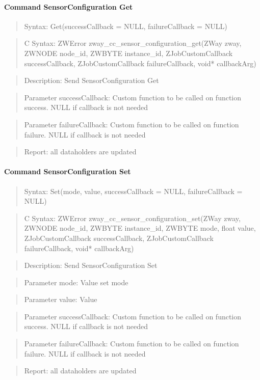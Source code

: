 \paragraph{Command SensorConfiguration Get}
\begin{quote}Syntax: Get(successCallback = NULL, failureCallback = NULL)\end{quote}
\begin{quote}C Syntax: ZWError zway\_cc\_sensor\_configuration\_get(ZWay zway, ZWNODE node\_id, ZWBYTE instance\_id, ZJobCustomCallback successCallback, ZJobCustomCallback failureCallback, void* callbackArg)\end{quote}
\begin{quote}Description: Send SensorConfiguration Get\end{quote}
\begin{quote}Parameter successCallback: Custom function to be called on function success. NULL if callback is not needed\end{quote}
\begin{quote}Parameter failureCallback: Custom function to be called on function failure. NULL if callback is not needed\end{quote}
\begin{quote}Report: all dataholders are updated\end{quote}

\paragraph{Command SensorConfiguration Set}
\begin{quote}Syntax: Set(mode, value, successCallback = NULL, failureCallback = NULL)\end{quote}
\begin{quote}C Syntax: ZWError zway\_cc\_sensor\_configuration\_set(ZWay zway, ZWNODE node\_id, ZWBYTE instance\_id, ZWBYTE mode, float value, ZJobCustomCallback successCallback, ZJobCustomCallback failureCallback, void* callbackArg)\end{quote}
\begin{quote}Description: Send SensorConfiguration Set\end{quote}
\begin{quote}Parameter mode: Value set mode\end{quote}
\begin{quote}Parameter value: Value\end{quote}
\begin{quote}Parameter successCallback: Custom function to be called on function success. NULL if callback is not needed\end{quote}
\begin{quote}Parameter failureCallback: Custom function to be called on function failure. NULL if callback is not needed\end{quote}
\begin{quote}Report: all dataholders are updated\end{quote}


